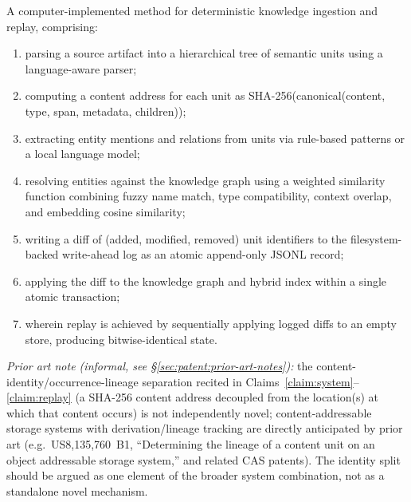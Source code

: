 \begin{claim}
\label{claim:replay}
A computer-implemented method for deterministic knowledge ingestion and replay, comprising:
\begin{enumerate}
  \item parsing a source artifact into a hierarchical tree of semantic units using a language-aware parser;
  \item computing a content address for each unit as SHA-256(canonical(content, type, span, metadata, children));
  \item extracting entity mentions and relations from units via rule-based patterns or a local language model;
  \item resolving entities against the knowledge graph using a weighted similarity function combining fuzzy name match, type compatibility, context overlap, and embedding cosine similarity;
  \item writing a diff of (added, modified, removed) unit identifiers to the filesystem-backed write-ahead log as an atomic append-only JSONL record;
  \item applying the diff to the knowledge graph and hybrid index within a single atomic transaction;
  \item wherein replay is achieved by sequentially applying logged diffs to an empty store, producing bitwise-identical state.
\end{enumerate}
\end{claim}

\par\noindent\emph{Prior art note (informal, see \S\ref{sec:patent:prior-art-notes}):} the content-identity/occurrence-lineage separation recited in Claims~\ref{claim:system}--\ref{claim:replay} (a SHA-256 content address decoupled from the location(s) at which that content occurs) is not independently novel; content-addressable storage systems with derivation/lineage tracking are directly anticipated by prior art (e.g.\ US8,135,760~B1, ``Determining the lineage of a content unit on an object addressable storage system,'' and related CAS patents). The identity split should be argued as one element of the broader system combination, not as a standalone novel mechanism.


